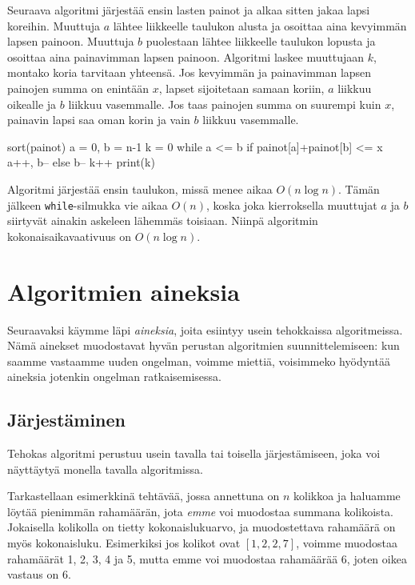 Seuraava algoritmi järjestää ensin lasten painot ja alkaa sitten
jakaa lapsi koreihin.
Muuttuja $a$ lähtee liikkeelle taulukon alusta ja
osoittaa aina kevyimmän lapsen painoon.
Muuttuja $b$ puolestaan lähtee liikkeelle taulukon lopusta ja
osoittaa aina painavimman lapsen painoon.
Algoritmi laskee muuttujaan $k$, montako koria tarvitaan yhteensä.
Jos kevyimmän ja painavimman lapsen
painojen summa on enintään $x$, lapset sijoitetaan samaan koriin,
$a$ liikkuu oikealle ja $b$ liikkuu vasemmalle.
Jos taas painojen summa on suurempi kuin $x$,
painavin lapsi saa oman korin ja vain $b$ liikkuu vasemmalle.

\begin{code}
sort(painot)
a = 0, b = n-1
k = 0
while a <= b
    if painot[a]+painot[b] <= x
        a++, b--
    else
        b--
    k++
print(k)
\end{code}

Algoritmi järjestää ensin taulukon, missä menee aikaa $O(n \log n)$.
Tämän jälkeen \texttt{while}-silmukka vie aikaa $O(n)$,
koska joka kierroksella muuttujat $a$ ja $b$ siirtyvät
ainakin askeleen lähemmäs toisiaan.
Niinpä algoritmin kokonais\-aikavaativuus on $O(n \log n)$.

\section{Algoritmien aineksia}

Seuraavaksi käymme läpi \emph{aineksia},
joita esiintyy usein tehokkaissa algoritmeissa.
Nämä ainekset muodostavat hyvän perustan algoritmien
suunnittelemiseen: kun saamme vastaamme uuden ongelman,
voimme miettiä, voisimmeko hyödyntää aineksia jotenkin
ongelman ratkaisemisessa.

\subsection{Järjestäminen}


Tehokas algoritmi perustuu usein tavalla tai
toisella järjestämiseen, joka voi näyttäytyä
monella tavalla algoritmissa.

Tarkastellaan esimerkkinä tehtävää, jossa annettuna on
$n$ kolikkoa ja haluamme löytää pienimmän rahamäärän,
jota \emph{emme} voi muodostaa summana kolikoista.
Jokaisella kolikolla on tietty kokonaislukuarvo, ja
muodostettava rahamäärä on myös kokonaisluku.
Esimerkiksi jos kolikot ovat $[1,2,2,7]$,
voimme muodostaa rahamäärät 1, 2, 3, 4 ja 5,
mutta emme voi muodostaa rahamäärää 6,
joten oikea vastaus on 6.

